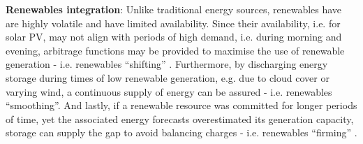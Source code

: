 \textbf{Renewables integration}: Unlike traditional energy sources, renewables have are highly volatile and have limited availability.
Since their availability, i.e. for solar PV, may not align with periods of high demand, i.e. during morning and evening, arbitrage functions may be provided to maximise the use of renewable generation - i.e. renewables ``shifting'' \cite{Zakeri2015}.
Furthermore, by discharging energy storage during times of low renewable generation, e.g. due to cloud cover or varying wind, a continuous supply of energy can be assured - i.e. renewables ``smoothing''.
And lastly, if a renewable resource was committed for longer periods of time, yet the associated energy forecasts overestimated its generation capacity, storage can supply the gap to avoid balancing charges - i.e. renewables ``firming'' \cite{Chakraborty2012}.





